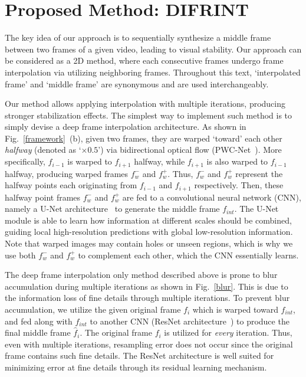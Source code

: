 \section{Proposed Method: DIFRINT}
\label{method}
The key idea of our approach is to sequentially synthesize a middle frame between two frames of a given video, leading to visual stability.
Our approach can be considered as a 2D method, where each consecutive frames undergo frame interpolation via utilizing neighboring frames.
Throughout this text, `interpolated frame' and `middle frame' are synonymous and are used interchangeably.

Our method allows applying interpolation with multiple iterations, producing stronger stabilization effects.
The simplest way to implement such method is to simply devise a deep frame interpolation architecture.
As shown in Fig.~\ref{framework}~(b), given two frames, they are warped `toward' each other \emph{halfway} (denoted as `$\times 0.5$') via bidirectional optical flow (PWC-Net~\cite{Sun_CVPR_2018}). 
More specifically, $f_{i-1}$ is warped to $f_{i+1}$ halfway, while $f_{i+1}$ is also warped to $f_{i-1}$ halfway, producing warped frames $f_w^-$ and $f_w^+$. 
Thus, $f_w^-$ and $f_w^+$ represent the halfway points each originating from $f_{i-1}$ and $f_{i+1}$ respectively.
Then, these halfway point frames $f_w^-$ and $f_w^+$ are fed to a convolutional neural network (CNN), namely a U-Net architecture~\cite{ronneberger2015u} to generate the middle frame $f_{int}$.
The U-Net module is able to learn how information at different scales should be combined, guiding local high-resolution predictions with global low-resolution information.
Note that warped images may contain holes or unseen regions, which is why we use both $f_w^-$ and $f_w^+$ to complement each other, which the CNN essentially learns.

The deep frame interpolation only method described above is prone to blur accumulation during multiple iterations as shown in Fig.~\ref{blur}.
This is due to the information loss of fine details through multiple iterations.
To prevent blur accumulation, we utilize the given original frame $f_i$ which is warped toward $f_{int}$, and fed along with $f_{int}$ to another CNN (ResNet architecture~\cite{he2016deep}) to produce the final middle frame $\hat{f}_i$.
The original frame $f_i$ is utilized for \emph{every} iteration.
Thus, even with multiple iterations, resampling error does not occur since the original frame contains such fine details.
The ResNet architecture is well suited for minimizing error at fine details through its residual learning mechanism.


